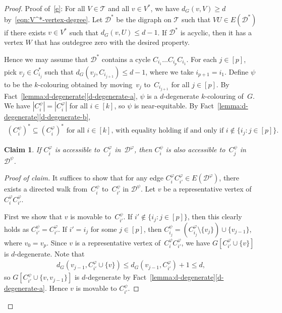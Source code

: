 \documentclass[11pt]{article}
\newenvironment{proofclaim}[1][Proof of claim]{\begin{proof}[#1]\renewcommand*{\qedsymbol}{\(\blacksquare\)}}{\end{proof}}
\theoremstyle{plain}
\newtheorem{claim}[thm]{Claim}
\numberwithin{equation}{section}
\begin{document}
\begin{proof}
	

	Proof of~\ref{e}:
	For all $V \in \mathcal{T}$ and all $ v \in V^*$, we have $d_G(v,V) \ge d$ by~\eqref{eqn:V^*-vertex-degree}.
	Let $\mathcal{D}^*$ be the digraph on $\mathcal{T}$ 	such that $VU\in E(\mathcal{D}^*)$ if there exists $v\in V^*$ such that $d_G(v,U) \le d-1$.
	If $\mathcal{D}^*$ is acyclic, then it has a vertex $W$ that has outdegree zero with the desired property.
	
	Hence we may assume that $\mathcal{D}^*$ contains a cycle $C_{i_1}\ldots C_{i_p}C_{i_1}$.
	For each $j \in [p]$, pick $v_j \in C_{i_j}^*$ such that  $d_G(v_{j},C_{i_{j+1}}) \le d-1$, where we take $i_{p+1} = i_1$.
	Define $\psi$ to be the $k$-colouring obtained by moving~$v_{j}$ to~$C_{i_{j+1}}$ for all $j \in [p]$.
	By Fact~\ref{lemma:d-degenerate}\ref{d-degenerate-a}, $\psi$ is a $d$-degenerate $k$-colouring of~$G$.
	We have $|C_i^\psi| = |C_i^\varphi|$ for all $i \in [k]$, so $\psi$ is near-equitable.
	By Fact~\ref{lemma:d-degenerate}\ref{d-degenerate-b},
	\begin{align}
	\text{$(C_{i}^{\psi})^* \subseteq (C_{i}^{\varphi})^*$ for all $i \in [k]$, with equality holding if and only if $i \notin \{i_j:j \in [p]\}$.} \label{eqn:d}
	\end{align}
	
    \begin{claim}\label{claim:Ci}
    If $C_i^\varphi$ is accessible to~$C_j^\varphi$ in~$\mathcal{D}^\varphi$, then $C_i^\psi$ is also accessible to~$C_j^\psi$ in~$\mathcal{D}^\psi$.
    \end{claim}

    \begin{proofclaim}
		It suffices to show that for any edge $C_i^\varphi C_{i'}^\varphi \in E(\mathcal{D}^\varphi)$, there exists a directed walk from~$C_i^\psi$ to~$C_{i'}^\psi$ in $\mathcal{D}^\psi$.
Let $v$ be a representative vertex of $C_i^\varphi C_{i'}^\varphi$.

First we show that $v$ is movable to~$C_{i'}^\psi$.
If $i' \notin \{i_j\colon j \in [p]\}$, then this clearly holds as $C_{i'}^\psi = C_{i'}^\varphi$.
If $i' = i_j$ for some $j \in  [p]$, then $C_{i_j}^\psi = (C_{i_j}^\varphi \setminus \{v_j\}) \cup \{v_{j-1}\}$, where $v_0 = v_p$.
Since $v$ is a representative vertex of~$C_i^\varphi C_{i'}^\varphi$, we have $G[C_{i'}^{\varphi} \cup \{v\}]$ is $d$-degenerate.
  Note that
    \begin{align*}
        d_G(v_{j-1},C^{\varphi}_{i'} \cup \{v\}) \le d_G(v_{j-1},C^{\varphi}_{i'})+1\le d,
    \end{align*}
    so $G[C_{i'}^{\psi} \cup \{v,v_{j-1}\}]$ is $d$-degenerate by Fact~\ref{lemma:d-degenerate}\ref{d-degenerate-a}.
Hence $v$ is movable to $C_{i'}^\psi$.
		

\end{proofclaim}
\end{proof}
\end{document}

